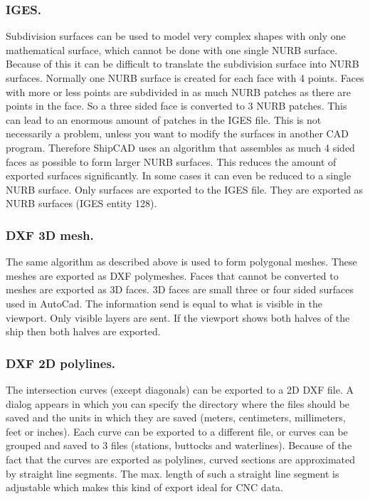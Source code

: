 \documentclass[12pt]{article}
\begin{document}
\subsubsection{IGES.}
Subdivision surfaces can be used to model very complex shapes with
only one mathematical surface, which cannot be done with one single
NURB surface. Because of this it can be difficult to translate the
subdivision surface into NURB surfaces. Normally one NURB surface is
created for each face with 4 points. Faces with more or less points
are subdivided in as much NURB patches as there are points in the
face. So a three sided face is converted to 3 NURB patches. This can
lead to an enormous amount of patches in the IGES file. This is not
necessarily a problem, unless you want to modify the surfaces in
another CAD program. Therefore ShipCAD uses an algorithm that
assembles as much 4 sided faces as possible to form larger NURB
surfaces. This reduces the amount of exported surfaces
significantly. In some cases it can even be reduced to a single NURB
surface. Only surfaces are exported to the IGES file. They are
exported as NURB surfaces (IGES entity 128).

\subsubsection{DXF 3D mesh.}
The same algorithm as described above is used to form polygonal meshes. These meshes are
exported as DXF polymeshes. Faces that cannot be converted to meshes are exported as 3D
faces. 3D faces are small three or four sided surfaces used in AutoCad. The information send is
equal to what is visible in the viewport. Only visible layers are sent. If the viewport shows both
halves of the ship then both halves are exported.

\subsubsection{DXF 2D polylines.}
The intersection curves (except diagonals) can be exported to a 2D DXF file. A dialog appears in
which you can specify the directory where the files should be saved and the units in which they are
saved (meters, centimeters, millimeters, feet or inches). Each curve can be exported to a different
file, or curves can be grouped and saved to 3 files (stations, buttocks and waterlines). Because of
the fact that the curves are exported as polylines, curved sections are approximated by straight line
segments. The max. length of such a straight line segment is adjustable which makes this kind of
export ideal for CNC data.
\end{document}
